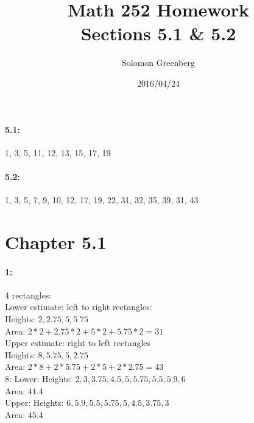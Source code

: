 \documentclass[12pt]{article}
\title{Math 252 Homework\\
\large Sections 5.1 \& 5.2}
\date{2016/04/24}
\author{Solomon Greenberg}
\begin{document}
    \newpage
    \paragraph*{5.1:} 1, 3, 5, 11, 12, 13, 15, 17, 19
    \paragraph*{5.2:} 1, 3, 5, 7, 9, 10, 12, 17, 19, 22, 31, 32, 35, 39, 31, 43

    \section*{Chapter 5.1}
    \paragraph*{1:\\} 
    4 rectangles:\\
        Lower estimate: left to right rectangles:\\
            Heights: ${2, 2.75, 5, 5.75}$\\
            Area: $2*2 + 2.75*2 + 5*2 + 5.75*2 = 31$\\
        Upper estimate: right to left rectangles\\
            Heights: ${8, 5.75, 5, 2.75}$\\
            Area: $2*8 + 2*5.75 + 2*5 + 2*2.75 = 43$\\
    8:
        Lower:
            Heights: ${2, 3, 3.75, 4.5, 5, 5.75, 5.5, 5.9, 6}$\\
            Area: $41.4$\\
        Upper:
            Heights: ${6, 5.9, 5.5, 5.75, 5, 4.5, 3.75, 3}$\\
            Area: $45.4$\\
    
\end{document}
